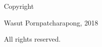 \thispagestyle{empty}
\vspace*{\fill}

\begin{center}
    Copyright

    Wasut Pornpatcharapong, 2018

    All rights reserved.
\end{center}
